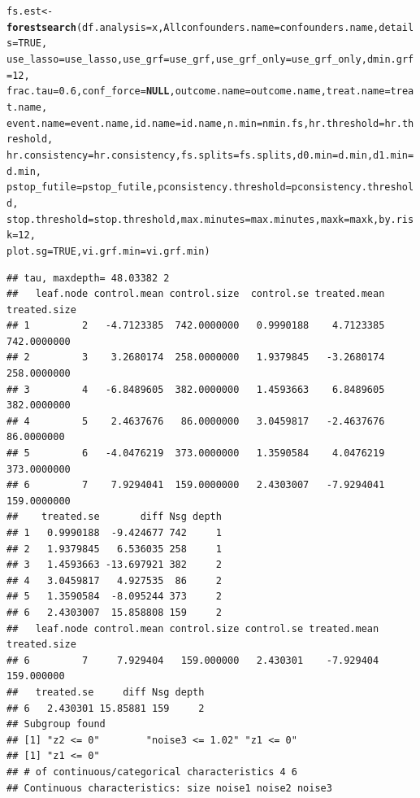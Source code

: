 \documentclass[smallextended]{svjour3}
\makeatletter
\newcommand{\hlnum}[1]{\textcolor[rgb]{0.686,0.059,0.569}{#1}}%
\newcommand{\hlstd}[1]{\textcolor[rgb]{0.345,0.345,0.345}{#1}}%
\newcommand{\hlkwa}[1]{\textcolor[rgb]{0.161,0.373,0.58}{\textbf{#1}}}%
\newcommand{\hlkwb}[1]{\textcolor[rgb]{0.69,0.353,0.396}{#1}}%
\newcommand{\hlkwc}[1]{\textcolor[rgb]{0.333,0.667,0.333}{#1}}%
\newcommand{\hlkwd}[1]{\textcolor[rgb]{0.737,0.353,0.396}{\textbf{#1}}}%
\newenvironment{kframe}{%
 \def\at@end@of@kframe{}%
 \ifinner\ifhmode%
  \def\at@end@of@kframe{\end{minipage}}%
  \begin{minipage}{\columnwidth}%
 \fi\fi%
 \def\FrameCommand##1{\hskip\@totalleftmargin \hskip-\fboxsep
 \colorbox{shadecolor}{##1}\hskip-\fboxsep
     \hskip-\linewidth \hskip-\@totalleftmargin \hskip\columnwidth}%
 \MakeFramed {\advance\hsize-\width
   \@totalleftmargin\z@ \linewidth\hsize
   \@setminipage}}%
 {\par\unskip\endMakeFramed%
 \at@end@of@kframe}
\newenvironment{knitrout}{}{} %
\makeatother
\begin{document}
\begin{knitrout}
\begin{kframe}
\begin{alltt}
\hlstd{fs.est} \hlkwb{<-} \hlkwd{forestsearch}\hlstd{(}\hlkwc{df.analysis} \hlstd{= x,} \hlkwc{Allconfounders.name} \hlstd{= confounders.name,} \hlkwc{details} \hlstd{=} \hlnum{TRUE}\hlstd{,}
    \hlkwc{use_lasso} \hlstd{= use_lasso,} \hlkwc{use_grf} \hlstd{= use_grf,} \hlkwc{use_grf_only} \hlstd{= use_grf_only,} \hlkwc{dmin.grf} \hlstd{=} \hlnum{12}\hlstd{,}
    \hlkwc{frac.tau} \hlstd{=} \hlnum{0.6}\hlstd{,} \hlkwc{conf_force} \hlstd{=} \hlkwa{NULL}\hlstd{,} \hlkwc{outcome.name} \hlstd{= outcome.name,} \hlkwc{treat.name} \hlstd{= treat.name,}
    \hlkwc{event.name} \hlstd{= event.name,} \hlkwc{id.name} \hlstd{= id.name,} \hlkwc{n.min} \hlstd{= nmin.fs,} \hlkwc{hr.threshold} \hlstd{= hr.threshold,}
    \hlkwc{hr.consistency} \hlstd{= hr.consistency,} \hlkwc{fs.splits} \hlstd{= fs.splits,} \hlkwc{d0.min} \hlstd{= d.min,} \hlkwc{d1.min} \hlstd{= d.min,}
    \hlkwc{pstop_futile} \hlstd{= pstop_futile,} \hlkwc{pconsistency.threshold} \hlstd{= pconsistency.threshold,}
    \hlkwc{stop.threshold} \hlstd{= stop.threshold,} \hlkwc{max.minutes} \hlstd{= max.minutes,} \hlkwc{maxk} \hlstd{= maxk,} \hlkwc{by.risk} \hlstd{=} \hlnum{12}\hlstd{,}
    \hlkwc{plot.sg} \hlstd{=} \hlnum{TRUE}\hlstd{,} \hlkwc{vi.grf.min} \hlstd{= vi.grf.min)}
\end{alltt}
\begin{verbatim}
## tau, maxdepth= 48.03382 2 
##   leaf.node control.mean control.size  control.se treated.mean treated.size
## 1         2   -4.7123385  742.0000000   0.9990188    4.7123385  742.0000000
## 2         3    3.2680174  258.0000000   1.9379845   -3.2680174  258.0000000
## 3         4   -6.8489605  382.0000000   1.4593663    6.8489605  382.0000000
## 4         5    2.4637676   86.0000000   3.0459817   -2.4637676   86.0000000
## 5         6   -4.0476219  373.0000000   1.3590584    4.0476219  373.0000000
## 6         7    7.9294041  159.0000000   2.4303007   -7.9294041  159.0000000
##    treated.se       diff Nsg depth
## 1   0.9990188  -9.424677 742     1
## 2   1.9379845   6.536035 258     1
## 3   1.4593663 -13.697921 382     2
## 4   3.0459817   4.927535  86     2
## 5   1.3590584  -8.095244 373     2
## 6   2.4303007  15.858808 159     2
##   leaf.node control.mean control.size control.se treated.mean treated.size
## 6         7     7.929404   159.000000   2.430301    -7.929404   159.000000
##   treated.se     diff Nsg depth
## 6   2.430301 15.85881 159     2
## Subgroup found 
## [1] "z2 <= 0"        "noise3 <= 1.02" "z1 <= 0"       
## [1] "z1 <= 0"
## # of continuous/categorical characteristics 4 6 
## Continuous characteristics: size noise1 noise2 noise3 

\end{verbatim}
\end{kframe}
\end{knitrout}
\end{document}
